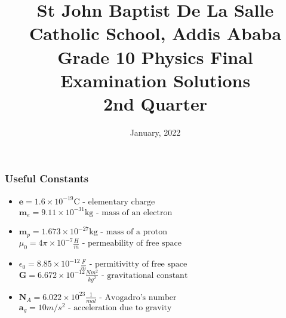 \documentclass[11pt,addpoints]{exam}
\date{January, 2022}\usepackage{geometry}
\begin{document}
	\title{St John Baptist De La Salle Catholic School, Addis Ababa\\
		\large Grade 10 Physics Final Examination Solutions\\
		2nd Quarter}
	\maketitle
	\begin{center}
		\subsubsection*{Useful Constants}
		\begin{itemize}
			\item $\textbf{e}=1.6\times10^{-19}\text{C}\text{  - elementary charge}$ \textbf{~}  $\textbf{m}_e=9.11\times10^{-31}\text{kg}\text{  - mass of an electron}$
			\item $\textbf{m}_p=1.673\times10^{-27}\text{kg}\text{  - mass of a proton}$ \textbf{~}$\mu_0=4\pi\times10^{-7}\frac{H}{m}\text{  - permeability of free space}$
			\item $\epsilon_0=8.85\times10^{-12}\frac{F}{m}\text{  - permitivitty of free space}$\textbf{~}$\textbf{G} = 6.672\times10^{-12}\frac{Nm^2}{kg^2}\text{  - gravitational constant}$
			\item $\textbf{N}_A = 6.022\times10^{23}\frac{1}{mol}\text{  - Avogadro's number}$$\textbf{~}$$\textbf{a}_g=10m/s^2\text{  - acceleration due to gravity}$
		\end{itemize}
	\end{center}
\end{document}
